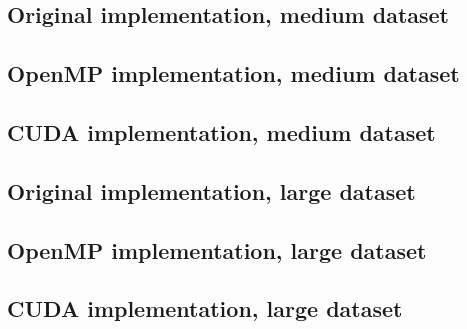 \documentclass[11pt]{article}
\begin{document}
\subsection{Original implementation, medium dataset}

\subsection{OpenMP implementation, medium dataset}

\subsection{CUDA implementation, medium dataset}


\subsection{Original implementation, large dataset}

\subsection{OpenMP implementation, large dataset}

\subsection{CUDA implementation, large dataset}

\end{document}
